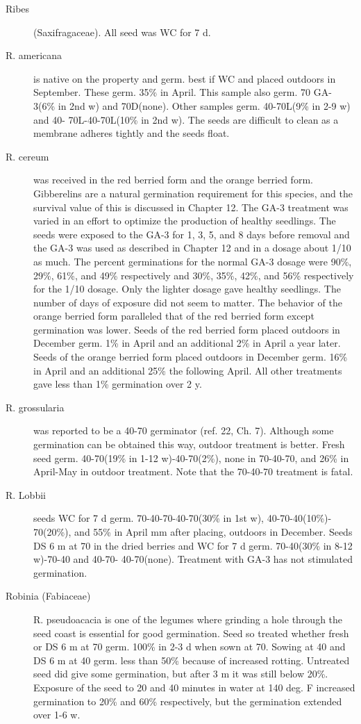 \begin{description}
\item[Ribes] (Saxifragaceae). All seed was WC for 7 d.
\item[R. americana] is native on the property and germ. best if WC and placed
outdoors in September. These germ. 35\% in April. This sample also germ. 70 GA-
3(6\% in 2nd w) and 70D(none). Other samples germ. 40-70L(9\% in 2-9 w) and 40-
70L-40-70L(10\% in 2nd w). The seeds are difficult to clean as a membrane adheres
tightly and the seeds float.

\item[R. cereum] was received in the red berried form and the orange berried form.
Gibberelins are a natural germination requirement for this species, and the survival
value of this is discussed in Chapter 12. The GA-3 treatment was varied in an effort to
optimize the production of healthy seedlings. The seeds were exposed to the GA-3 for
1, 3, 5, and 8 days before removal and the GA-3 was used as described in Chapter 12
and in a dosage about 1/10 as much. The percent germinations for the normal GA-3
dosage were 90\%, 29\%, 61\%, and 49\% respectively and 30\%, 35\%, 42\%, and 56\%
respectively for the 1/10 dosage. Only the lighter dosage gave healthy seedlings. The
number of days of exposure did not seem to matter. The behavior of the orange
berried form paralleled that of the red berried form except germination was lower.
Seeds of the red berried form placed outdoors in December germ. 1\% in April and an
additional 2\% in April a year later. Seeds of the orange berried form placed outdoors
in December germ. 16\% in April and an additional 25\% the following April. All other
treatments gave less than 1\% germination over 2 y.

\item[R. grossularia] was reported to be a 40-70 germinator (ref. 22, Ch. 7). Although
some germination can be obtained this way, outdoor treatment is better. Fresh seed
germ. 40-70(19\% in 1-12 w)-40-70(2\%), none in 70-40-70, and 26\% in April-May in
outdoor treatment. Note that the 70-40-70 treatment is fatal.
\item[R. Lobbii] seeds WC for 7 d germ. 70-40-70-40-70(30\% in 1st w), 40-70-40(10\%)-
70(20\%), and 55\% in April mm after placing, outdoors in December. Seeds DS 6 m
at 70 in the dried berries and WC for 7 d germ. 70-40(30\% in 8-12 w)-70-40 and 40-70-
40-70(none). Treatment with GA-3 has not stimulated germination.

\item[Robinia (Fabiaceae)] R. pseudoacacia is one of the legumes where
grinding a hole through the seed coast is essential for good germination. Seed so
treated whether fresh or DS 6 m at 70 germ. 100\% in 2-3 d when sown at 70. Sowing
at 40 and DS 6 m at 40 germ. less than 50\% because of increased rotting. Untreated
seed did give some germination, but after 3 m it was still below 20\%. Exposure of the
seed to 20 and 40 minutes in water at 140 deg. F increased germination to 20\% and
60\% respectively, but the germination extended over 1-6 w.


\end{description}
